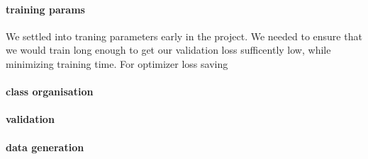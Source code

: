 \documentclass{article}
\begin{document}
\paragraph{training params}
We settled into traning parameters early in the project.
We needed to ensure that we would train long enough to get our validation loss sufficently low, while minimizing training time.
For
optimizer
loss
saving


\paragraph{class organisation}
\paragraph{validation}
\paragraph{data generation}






\end{document}
